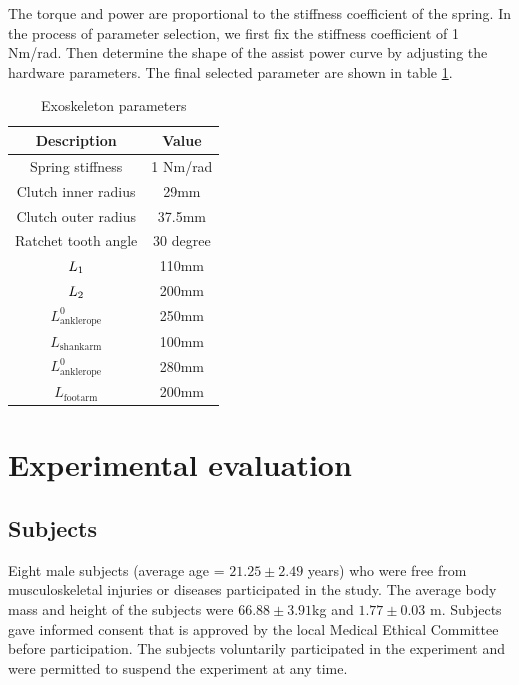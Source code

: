 \documentclass[twocolumn,cleanfoot,10pt]{asme2ej}
\begin{document}
The torque and power are proportional to the stiffness coefficient of the spring. In the process of parameter selection, we first fix the stiffness coefficient of 1 Nm/rad. Then determine the shape of the assist power curve by adjusting the hardware parameters. The final selected parameter are shown in table \ref{tab:Exoskeleton parameters}.

\begin{table}[t]
	\caption{Exoskeleton parameters}
	\begin{center}
		\label{tab:Exoskeleton parameters}
		\begin{tabular}{c c}	
			\hline
			\textbf{Description } & \textbf{Value} \\
			\hline
			Spring stiffness & 1 Nm/rad\\
			Clutch inner radius & 29mm\\
			Clutch outer radius & 37.5mm\\
			Ratchet tooth angle & 30 degree\\
			$L_\textrm1$ & 110mm\\
			$L_\textrm2$ & 200mm\\
			$L_\textrm{anklerope}^0$ & 250mm\\
			$L_\textrm{shankarm}$  & 100mm\\
			$L_\textrm{anklerope}^0$ & 280mm\\
			$L_\textrm{footarm}$ & 200mm\\
			\hline
		\end{tabular}
	\end{center}
\end{table}

\section{Experimental evaluation}
\label{sec:experiment}

\subsection{Subjects}
Eight male subjects (average age = $21.25 \pm2.49$  years) who were free from musculoskeletal injuries or diseases participated in the study. The average body mass and height of the subjects were $66.88\pm3.91$kg and $1.77\pm0.03$ m. Subjects gave informed consent that is approved by the local Medical Ethical Committee before participation. The subjects voluntarily participated in the experiment and were permitted to suspend the experiment at any time.   
\end{document}
